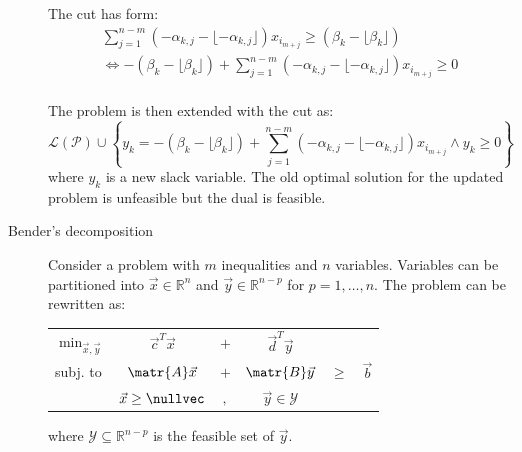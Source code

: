 \begin{descriptionlist}
\begin{description}
                The cut has form:
                \[ 
                    \begin{gathered}
                        \sum_{j=1}^{n-m} (-\alpha_{k,j} - \lfloor -\alpha_{k,j} \rfloor) x_{i_{m+j}} \geq (\beta_k - \lfloor \beta_k \rfloor) \\
                        \iff -(\beta_k - \lfloor \beta_k \rfloor) + \sum_{j=1}^{n-m} (-\alpha_{k,j} - \lfloor -\alpha_{k,j} \rfloor) x_{i_{m+j}} \geq 0 \\
                    \end{gathered}
                \]

                The problem is then extended with the cut as:
                \[ 
                    \mathcal{L}(\mathcal{P}) \cup \left\{ y_k = -(\beta_k - \lfloor \beta_k \rfloor) + \sum_{j=1}^{n-m} (-\alpha_{k,j} - \lfloor -\alpha_{k,j} \rfloor) x_{i_{m+j}} 
                    \land y_k \geq 0 \right\} 
                \]
                where $y_k$ is a new slack variable.
                The old optimal solution for the updated problem is unfeasible but the dual is feasible.

            \item[Bender's decomposition] 
                Consider a problem with $m$ inequalities and $n$ variables.
                Variables can be partitioned into $\vec{x} \in \mathbb{R}^n$ and $\vec{y} \in \mathbb{R}^{n-p}$ for $p = 1, \dots, n$.
                The problem can be rewritten as:
                \begin{center}
                    \begin{tabular}{lccccc}
                        $\min_{\vec{x}, \vec{y}}$ & $\vec{c}^T\vec{x}$ & $+$ & $\vec{d}^T\vec{y}$ \\
                        subj. to & $\matr{A}\vec{x}$ & $+$ & $\matr{B}\vec{y}$ & $\geq$ & $\vec{b}$ \\
                                 & $\vec{x} \geq \nullvec$ & $,$ & $\vec{y} \in \mathcal{Y}$
                    \end{tabular}
                \end{center}
                where $\mathcal{Y} \subseteq \mathbb{R}^{n-p}$ is the feasible set of $\vec{y}$.
                

\end{description}
\end{descriptionlist}
